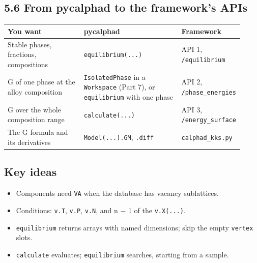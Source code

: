 \documentclass[12pt,a4paper]{article}
\begin{document}
\subsection*{5.6 From pycalphad to the framework's APIs}
\begingroup\small
\begin{longtable}{>{\raggedright\arraybackslash}p{0.321\linewidth}>{\raggedright\arraybackslash}p{0.418\linewidth}>{\raggedright\arraybackslash}p{0.181\linewidth}}
\toprule
\textbf{You want} & \textbf{pycalphad} & \textbf{Framework} \\
\midrule
\endhead
Stable phases, fractions, compositions & \texttt{equilibrium(.\allowbreak{}.\allowbreak{}.\allowbreak{})} & API 1, \texttt{/\allowbreak{}equilibrium} \\
G of one phase at the alloy composition & \texttt{IsolatedPhase} in a \texttt{Workspace} (Part 7), or \texttt{equilibrium} with one phase & API 2, \texttt{/\allowbreak{}phase\_\allowbreak{}energies} \\
G over the whole composition range & \texttt{calculate(.\allowbreak{}.\allowbreak{}.\allowbreak{})} & API 3, \texttt{/\allowbreak{}energy\_\allowbreak{}surface} \\
The G formula and its derivatives & \texttt{Model(.\allowbreak{}.\allowbreak{}.\allowbreak{}).\allowbreak{}GM}, \texttt{.\allowbreak{}diff} & \texttt{calphad\_\allowbreak{}kks.\allowbreak{}py} \\
\bottomrule
\end{longtable}
\endgroup

\subsection*{Key ideas}
\begin{itemize}
\item Components need \texttt{VA} when the database has vacancy sublattices.
\item Conditions: \texttt{v.\allowbreak{}T}, \texttt{v.\allowbreak{}P}, \texttt{v.\allowbreak{}N}, and n \(-\) 1 of the \texttt{v.\allowbreak{}X(.\allowbreak{}.\allowbreak{}.\allowbreak{})}.
\item \texttt{equilibrium} returns arrays with named dimensions; skip the empty \texttt{vertex} slots.
\item \texttt{calculate} evaluates; \texttt{equilibrium} searches, starting from a sample.
\end{itemize}
\end{document}
